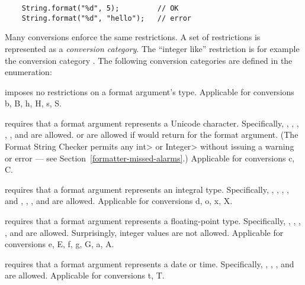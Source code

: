 \begin{Verbatim}
    String.format("%d", 5);         // OK
    String.format("%d", "hello");   // error
\end{Verbatim}

\noindent Many conversions enforce the same restrictions.  A set of
restrictions is represented as a \emph{conversion
category}. The ``integer like'' restriction is for example the conversion
category \@.  The following conversion categories are defined in the
 enumeration:

\begin{description}
\item{} imposes no restrictions on a format argument's type. Applicable for
    conversions b, B, h, H, s, S.

\item{} requires that a format argument represents a Unicode character.
    Specifically, , , ,
    , , and  are allowed.
     or  are allowed if
     would return 
    for the format argument. (The Format String Checker permits any \<int>
    or \<Integer> without issuing a warning or error --- see
    Section~\ref{formatter-missed-alarms}.)
    Applicable for conversions c, C.

\item{} requires that a format argument represents an integral type. Specifically,
    , , , ,
     and , ,
    , and  are allowed. Applicable for
    conversions d, o, x, X.

\item{} requires that a format argument represents a floating-point type.  Specifically,
    , , ,
    , and  are allowed. Surprisingly, integer
    values are not allowed. Applicable for
    conversions e, E, f, g, G, a, A.

\item{} requires that a format argument represents a date or time.
    Specifically, , , , and
     are allowed.  Applicable for conversions t, T.


\end{description}
